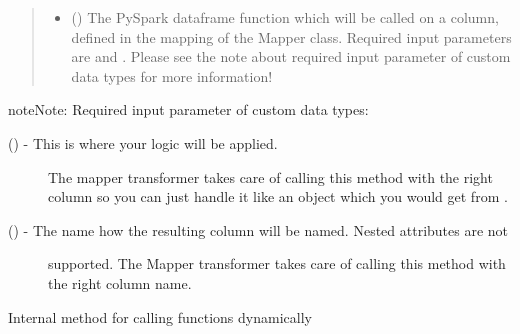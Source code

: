 \documentclass[a4paper,10pt, twoside,english]{sphinxmanual}
\begin{document}
\begin{fulllineitems}
\begin{quote}
\begin{description}
\begin{itemize}
\item {} 
 () \textendash{} The PySpark dataframe function which will be called on a column, defined in the mapping
of the Mapper class.
Required input parameters are  and .
Please see the note about required input parameter of custom data types for more information!

\end{itemize}

\end{description}\end{quote}

\begin{sphinxadmonition}{note}{Note:}
Required input parameter of custom data types:
\begin{description}
\item[{ () - This is where your logic will be applied.}] \leavevmode
The mapper transformer takes care of calling this method with the right column so you can just
handle it like an object which you would get from .

\item[{ () - The name how the resulting column will be named. Nested attributes are not}] \leavevmode
supported. The Mapper transformer takes care of calling this method with the right column name.

\end{description}
\end{sphinxadmonition}

\end{fulllineitems}


\begin{fulllineitems}
\label{\detokenize{transformer/mapper:spooq2.transformer.mapper_custom_data_types._get_select_expression_for_custom_type}}
Internal method for calling functions dynamically

\end{fulllineitems}
\end{document}

